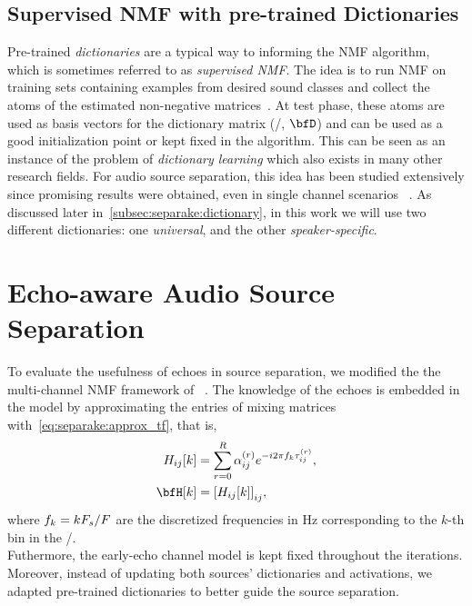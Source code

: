 \subsection{Supervised NMF with pre-trained Dictionaries}
Pre-trained \textit{dictionaries} are a typical way to informing the \ac{NMF} algorithm, which is sometimes referred to as \textit{supervised \ac{NMF}}.
The idea is to run \ac{NMF} on training sets containing examples from desired sound classes and collect the atoms of the estimated non-negative matrices~.
At test phase, these atoms are used as basis vectors for the dictionary matrix (\ie/, $\mD$) and can be used as a good initialization point or kept fixed in the algorithm.
This can be seen as an instance of the problem of \textit{dictionary learning} which also exists in many other research fields.
For audio source separation, this idea has been studied extensively since promising results were obtained, even in single channel scenarios ~.
As discussed later in~\cref{subsec:separake:dictionary}, in this work we will use two different dictionaries: one \textit{universal}, and the other \textit{speaker-specific}.


\section{Echo-aware Audio Source Separation}
To evaluate the usefulness of echoes in source separation, we modified the the multi-channel \ac{NMF} framework of \citeauthor{ozerov2010multichannel}~.
The knowledge of the echoes is embedded in the model by approximating the entries of mixing matrices with~\eqref{eq:separake:approx_tf}, that is,
\begin{equation}
    \begin{aligned}
        \FLT_{\idxMicSrc}[k] &= \sum_{\idxEch=0}^{\numEchs} \alpha_{\idxMicSrc}^{(\idxEch)} \cste^{-\csti 2 \pi f_k \tau_{\idxMicSrc}^{(\idxEch)}},\\
        \FLTSS[k] &= \kbracket{\FLT_{\idxMicSrc}[k]}_{\idxMicSrc},
    \end{aligned}
\end{equation}
where $f_k = kF_s/F$ are the discretized frequencies in Hz corresponding to the $k$-th bin in the \DFT/.
\\Futhermore, the early-echo channel model is kept fixed throughout the iterations.
Moreover, instead of updating both sources' dictionaries and activations, we adapted pre-trained dictionaries to better guide the source separation.

